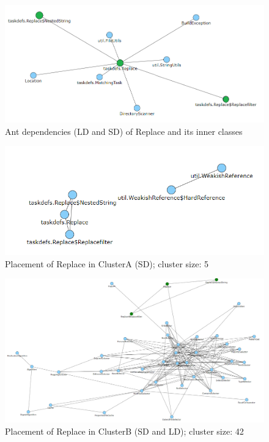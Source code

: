 \documentclass[conference]{IEEEtran}
\begin{document}
\begin{figure}
\centering
\includegraphics[width=\columnwidth]{dep_replace.png}
\caption{Ant dependencies (LD and SD) of Replace and its inner classes}
\label{fig:dep_replace}
\centering
\end{figure}

\begin{figure}
\centering
\includegraphics[width=\columnwidth]{cluster_replaceSD.PNG}
\caption{Placement of Replace in ClusterA (SD); cluster size: 5}
\label{fig:clusterAreplace}
\centering
\end{figure}


\begin{figure}
\centering
\includegraphics[width=\columnwidth]{cluster_replaceSDLD.PNG}
\caption{Placement of Replace in ClusterB (SD and LD); cluster size: 42}
\label{fig:clusterBreplace}
\centering
\end{figure}
\end{document}
